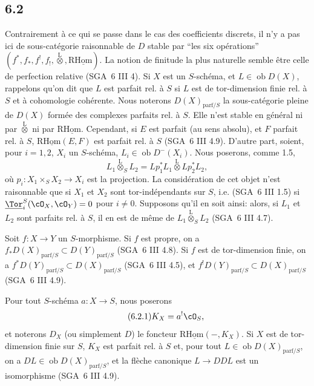 \subsection*{6.2}
Contrairement à ce qui se passe dans le cas des coefficients discrets, il n'y a pas ici de sous-catégorie raisonnable de $D$ stable par ``les six opérations'' $(f^*,f_*,f^!,f_!,\overset{\mathrm{L}}{\otimes},\mathrm{R}\underline{\mathrm{Hom}})$. La notion de finitude la plus naturelle semble être celle de perfection relative (SGA~6 III 4). Si $X$ est un $S$-schéma, et $L\in\operatorname{ob}D(X)$, 
rappelons qu'on dit que $L$ est parfait rel. à $S$ si $L$ est de tor-dimension finie rel. à $S$ et à
cohomologie cohérente. Nous noterons $D(X)_{\mathrm{parf}/S}$ la sous-catégorie pleine de $D(X)$ formée des complexes parfaits rel. à $S$. Elle n'est stable en général ni par $\overset{\mathrm{L}}{\otimes}$ ni par $\mathrm{R}\underline{\mathrm{Hom}}$. Cependant, si $E$ est parfait (au sens absolu), et $F$ parfait rel. à $S$, $\mathrm{R}\underline{\mathrm{Hom}}(E,F)$ est parfait rel. à $S$ (SGA~6 III 4.9). D'autre part, soient, pour $i=1,2$, $X_i$ un $S$-schéma, $L_i\in\operatorname{ob}D^{-}(X_i)$. Nous poserons, comme 1.5,
\[
L_1\overset{\mathrm{L}}{\otimes}_SL_2=Lp_1^*L_1\overset{\mathrm{L}}{\otimes}Lp_2^*L_2,
\]
où $p_i:X_1\times_SX_2\to X_i$ est la projection. La considération de cet objet n'est raisonnable que si $X_1$ et $X_2$ sont tor-indépendants sur $S$, i.e. (SGA~6 III 1.5) si $\underline{\Tor}_i^S(\cO_X,\cO_Y)=0$ pour $i\ne0$. Supposons qu'il en soit ainsi: alors, si $L_1$ et $L_2$ sont parfaits rel. à $S$, il en est de même de $L_1\overset{\mathrm{L}}{\otimes}_SL_2$ (SGA~6 III 4.7).

Soit $f:X\to Y$ un $S$-morphisme. Si $f$ est propre, on a $f_*D(X)_{\mathrm{parf}/S}\subset D(Y)_{\mathrm{parf}/S}$ (SGA~6 III 4.8). Si $f$ est de tor-dimension finie, on a $f^*D(Y)_{\mathrm{parf}/S}\subset D(X)_{\mathrm{parf}/S}$ (SGA~6 III 4.5), et $f^!D(Y)_{\mathrm{parf}/S}\subset D(X)_{\mathrm{parf}/S}$ (SGA~6 III 4.9).

Pour tout $S$-schéma $a:X\to S$, nous poserons
\begin{equation}
\tag{6.2.1}
K_X=a^!\cO_S,
\end{equation}
et noterons $D_X$ (ou simplement $D$) le foncteur $\mathrm{R}\underline{\mathrm{Hom}}(-,K_X)$. Si $X$ est de tor-dimension finie sur $S$, $K_X$ est parfait rel. à $S$ et, pour tout $L\in\operatorname{ob}D(X)_{\mathrm{parf}/S}$, on a $DL\in\operatorname{ob}D(X)_{\mathrm{parf}/S}$, et la flèche canonique $L\to DDL$ est un isomorphisme (SGA~6 III 4.9).

